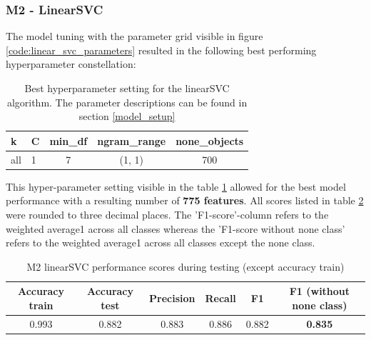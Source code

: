 \subsubsection{M2 - LinearSVC}
The model tuning with the parameter grid visible in figure \ref{code:linear_svc_parameters} resulted in the following best performing hyperparameter constellation:

\begin{table}[h!]
\begin{center}
\caption{Best hyperparameter setting for the linearSVC algorithm. The parameter descriptions can be found in section \ref{model_setup}}\vspace{1ex}
\label{tab:m2_linearSVC_bestParams}
\begin{tabular}{llccc}\hline
k & C & min\_df & ngram\_range & none\_objects \\ \hline
all & 1 & 7 & (1, 1) & 700 \\ \hline
\end{tabular}
\end{center}
\end{table}

This hyper-parameter setting visible in the table \ref{tab:m2_linearSVC_bestParams} allowed for the best model performance with a resulting number of \textbf{775 features}. All scores listed in table \ref{tab:m2_linearSVC_bestscores} were rounded to three decimal places. The 'F1-score'-column refers to the weighted average1 across all classes whereas the 'F1-score without none class' refers to the weighted average1 across all classes except the none class.

\begin{table}[h!]
\begin{center}
\caption{M2 linearSVC performance scores during testing (except accuracy train)}\vspace{1ex}
\label{tab:m2_linearSVC_bestscores}
\begin{tabular}{cccccc}\hline
Accuracy train & Accuracy test & Precision & Recall & F1 & F1 (without none class)\\ \hline
0.993 & 0.882 & 0.883 & 0.886 & 0.882 & \textbf{0.835} \\ \hline
\end{tabular}
\end{center}
\end{table}

